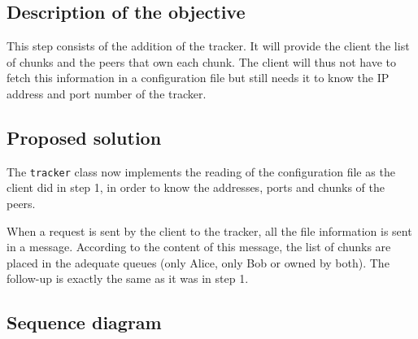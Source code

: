 \subsection{Description of the objective}

This step consists of the addition of the tracker. It will provide the client the list of chunks and the peers that own each chunk. The client will thus not have to fetch this information in a configuration file but still needs it to know the IP address and port number of the tracker.

\subsection{Proposed solution}

The \texttt{tracker} class now implements the reading of the configuration file as the client did in step 1, in order to know the addresses, ports and chunks of the peers.

When a request is sent by the client to the tracker, all the file information is sent in a message. According to the content of this message, the list of chunks are placed in the adequate queues (only Alice, only Bob or owned by both). The follow-up is exactly the same as it was in step 1. 

\subsection{Sequence diagram}